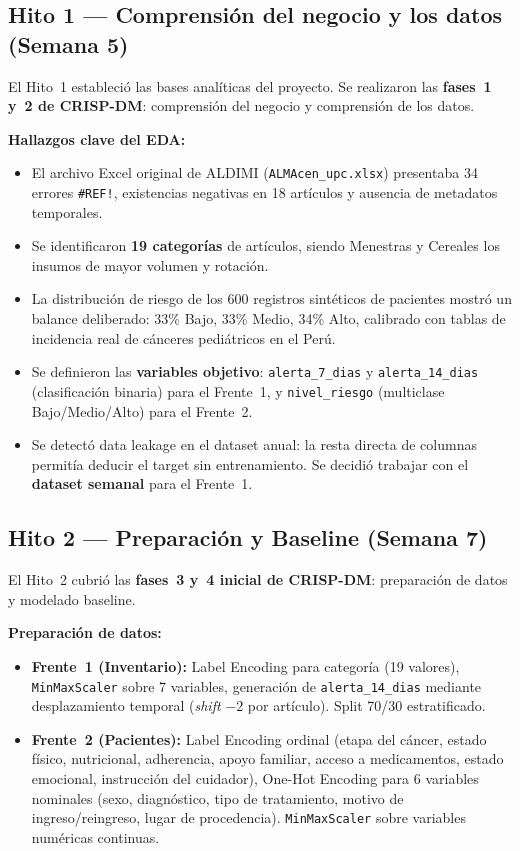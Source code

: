 \documentclass[12pt, a4paper]{article}
\begin{document}
\subsection{Hito 1 --- Comprensi\'on del negocio y los datos (Semana 5)}

El Hito~1 estableci\'o las bases anal\'iticas del proyecto. Se realizaron las \textbf{fases~1 y~2 de CRISP-DM}: comprensi\'on del negocio y comprensi\'on de los datos.

\textbf{Hallazgos clave del EDA:}
\begin{itemize}[leftmargin=1.5em, itemsep=3pt]
  \item El archivo Excel original de ALDIMI (\texttt{ALMAcen\_upc.xlsx}) presentaba 34 errores \texttt{\#REF!}, existencias negativas en 18 art\'iculos y ausencia de metadatos temporales.
  \item Se identificaron \textbf{19 categor\'ias} de art\'iculos, siendo Menestras y Cereales los insumos de mayor volumen y rotaci\'on.
  \item La distribución de riesgo de los 600 registros sint\'eticos de pacientes mostr\'o un balance deliberado: 33\% Bajo, 33\% Medio, 34\% Alto, calibrado con tablas de incidencia real de c\'anceres pedi\'atricos en el Per\'u.
  \item Se definieron las \textbf{variables objetivo}: \texttt{alerta\_7\_dias} y \texttt{alerta\_14\_dias} (clasificaci\'on binaria) para el Frente~1, y \texttt{nivel\_riesgo} (multiclase Bajo/Medio/Alto) para el Frente~2.
  \item Se detect\'o data leakage en el dataset anual: la resta directa de columnas permit\'ia deducir el target sin entrenamiento. Se decidi\'o trabajar con el \textbf{dataset semanal} para el Frente~1.
\end{itemize}

\subsection{Hito 2 --- Preparaci\'on y Baseline (Semana 7)}

El Hito~2 cubri\'o las \textbf{fases~3 y~4 inicial de CRISP-DM}: preparaci\'on de datos y modelado baseline.

\textbf{Preparaci\'on de datos:}
\begin{itemize}[leftmargin=1.5em, itemsep=3pt]
  \item \textbf{Frente~1 (Inventario):} Label Encoding para categor\'ia (19 valores), \texttt{MinMaxScaler} sobre 7 variables, generaci\'on de \texttt{alerta\_14\_dias} mediante desplazamiento temporal (\textit{shift} $-2$ por art\'iculo). Split 70/30 estratificado.
  \item \textbf{Frente~2 (Pacientes):} Label Encoding ordinal (etapa del c\'ancer, estado f\'isico, nutricional, adherencia, apoyo familiar, acceso a medicamentos, estado emocional, instrucci\'on del cuidador), One-Hot Encoding para 6 variables nominales (sexo, diagn\'ostico, tipo de tratamiento, motivo de ingreso/reingreso, lugar de procedencia). \texttt{MinMaxScaler} sobre variables num\'ericas continuas.
\end{itemize}
\end{document}
